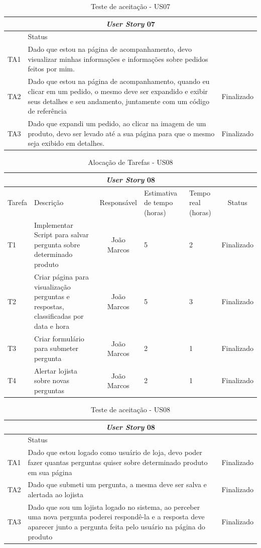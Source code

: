\documentclass[a4paper,12pt]{monografia}
\begin{document}
\begin{longtable}{|l|p{11.8cm}|c|}
\caption{Teste de aceitação - US07}
\label{quadro:teste-aceitacao-us07}
\hline
\multicolumn{3}{|c|}{\textbf{\textit{User Story} 07}}\\
\hline		
\rowcolor{ballblue}
\multicolumn{2}{|c|}{Testes de aceitação} & Status\\	
\hline
TA1 & Dado que estou na página de acompanhamento, devo visualizar minhas informações e informações sobre pedidos feitos por mim.\\
\hline
TA2 & Dado que estou na página de acompanhamento, quando eu clicar em um pedido, o mesmo deve ser expandido e exibir seus detalhes e seu andamento, juntamente com um código de referência   & Finalizado\\
\hline
TA3 & Dado que expandi um pedido, ao clicar na imagem de um produto, devo ser levado até a sua página para que o mesmo seja exibido em detalhes.   & Finalizado\\
\hline
\end{longtable}


\begin{longtable}{|p{1.5cm}|p{3.5cm}|c|p{2cm}|p{2cm}|c|}
\caption{Alocação de Tarefas - US08}
\label{quadro:tat-us08}
\hline
\multicolumn{6}{|c|}{\textbf{\textit{User Story} 08}}\\
\hline		
\rowcolor{ballblue}
Tarefa & Descrição & Responsável & Estimativa de tempo (horas) & Tempo real (horas) & Status\\
\hline
T1 & Implementar Script para salvar pergunta sobre determinado produto & João Marcos & 5 & 2 & Finalizado\\
\hline
T2 & Criar página para visualização perguntas e respostas, classificadas por data e hora & João Marcos & 5 & 3 & Finalizado\\
\hline
T3 & Criar formulário para submeter pergunta & João Marcos & 2 & 1 & Finalizado\\
\hline
T4 & Alertar lojista sobre novas perguntas & João Marcos & 2 & 1 & Finalizado\\
\hline
\end{longtable}

\begin{longtable}{|l|p{11.8cm}|c|}
\caption{Teste de aceitação - US08}
\label{quadro:teste-aceitacao-us08}
\hline
\multicolumn{3}{|c|}{\textbf{\textit{User Story} 08}}\\
\hline		
\rowcolor{ballblue}
\multicolumn{2}{|c|}{Testes de aceitação} & Status\\	
\hline
TA1 & Dado que estou logado como usuário de loja, devo poder fazer quantas perguntas quiser sobre determinado produto em sua página & Finalizado\\
\hline
TA2 & Dado que submeti um pergunta, a mesma deve ser salva e alertada ao lojista  & Finalizado\\
\hline
TA3 & Dado que sou um lojista logado no sistema, ao perceber uma nova pergunta poderei respondê-la e a resposta deve aparecer junto a pergunta feita pelo usuário na página do produto   & Finalizado\\
\hline
\end{longtable}
\end{document}
